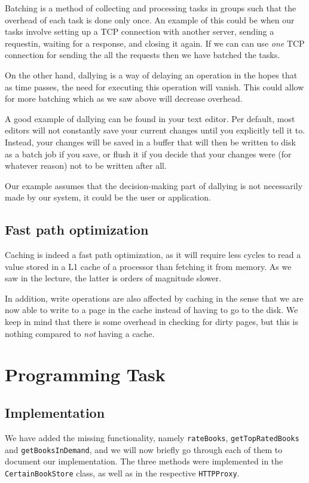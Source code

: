 \documentclass[11pt]{article}
\begin{document}
Batching is a method of collecting and processing tasks in groups such that
the overhead of each task is done only once.
An example of this could be when our tasks involve setting up a TCP connection
with another server, sending a requestin, waiting for a response, and closing
it again. If we can can use \emph{one} TCP connection for sending the all the
requests then we have batched the tasks.

On the other hand, dallying is a way of delaying an operation in the hopes that
as time passes, the need for executing this operation will vanish. This
could allow for more batching which as we saw above will decrease overhead. 

A good example of dallying can be found in your text editor. Per default, most
editors will not constantly save your current changes until you explicitly
tell it to. Instead, your changes will be saved in a buffer that will then be
written to disk as a batch job if you save, or flush it if you decide that your
changes were (for whatever reason) not to be written after all.

Our example assumes that the decision-making part of dallying is not necessarily
made by our system, it could be the user or application.

\subsection*{Fast path optimization}

Caching is indeed a fast path optimization, as it will require less cycles to
read a value stored in a L1 cache of a processor than fetching it from memory.
As we saw in the lecture, the latter is orders of magnitude slower.

In addition, write operations are also affected by caching in the sense that
we are now able to write to a page in the cache instead of having to go to the
disk.
We keep in mind that there is some overhead in checking for dirty pages, but
this is nothing compared to \emph{not} having a cache.


\section*{Programming Task}

\subsection*{Implementation}
We have added the missing functionality, namely \texttt{rateBooks},
\texttt{getTopRatedBooks} and \texttt{getBooksInDemand}, and we will now briefly go through each of them to document our implementation.
The three methods were implemented in the \texttt{CertainBookStore} class, as
well as in the respective \texttt{HTTPProxy}.
\end{document}
